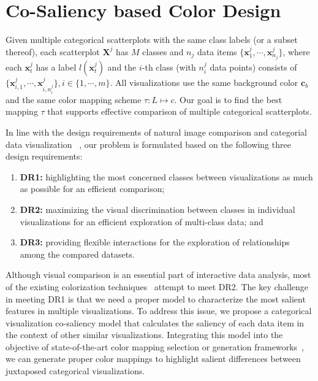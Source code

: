 \section{Co-Saliency based Color Design}
Given multiple categorical scatterplots with the same class labels (or a subset thereof), each scatterplot $\mathbf{X}^j$ has $M$ classes and $n_j$ data items $\{\mathbf{x}^j_1, \cdots, \mathbf{x}^j_{n_j}\}$, where each $\mathbf{x}^j_t$ has a label
$l(\mathbf{x}^j_t)$ and the $i$-th class (with $n^j_i$ data points) consists of $\{\mathbf{x}_{i,1}^j, \cdots , \mathbf{x}_{i,n^j_i}^j\}, i \in  \{ 1, \cdots, m \} $.
All visualizations use the same  background color $\mathbf{c}_b$ and the same color mapping scheme $\tau: L \mapsto c$. Our goal is to find the best mapping $\tau$ that supports effective comparison of multiple categorical scatterplots.

In line with the design requirements of natural image comparison and categorial data visualization ~\cite{Jacobs10,Gleicher18,Lu21},
our problem is formulated based on the following three design requirements:
\begin{enumerate}[label=(\roman*),nosep]
\item \textbf{DR1:} highlighting the most concerned classes between visualizations as much as possible for an efficient comparison;
\item \textbf{DR2:} maximizing the visual discrimination between classes in individual visualizations for an efficient exploration of multi-class data; and
\item \textbf{DR3:} providing flexible interactions for the exploration of relationships among the compared datasets.
\end{enumerate}
Although visual comparison is an essential part of interactive data analysis, most of  the existing  colorization techniques~\cite{Gramazio17, Lu21} attempt to meet DR2. The key challenge in meeting DR1 is that we need a proper model to characterize the most salient features in multiple visualizations.
To address this issue, we propose a categorical visualization co-saliency model that calculates the saliency of each data item in the context of other similar visualizations. Integrating this model into the objective of state-of-the-art color mapping selection or generation frameworks~\cite{Wang2018,Lu21}, we can
generate proper color mappings to highlight salient differences between juxtaposed categorical visualizations.

